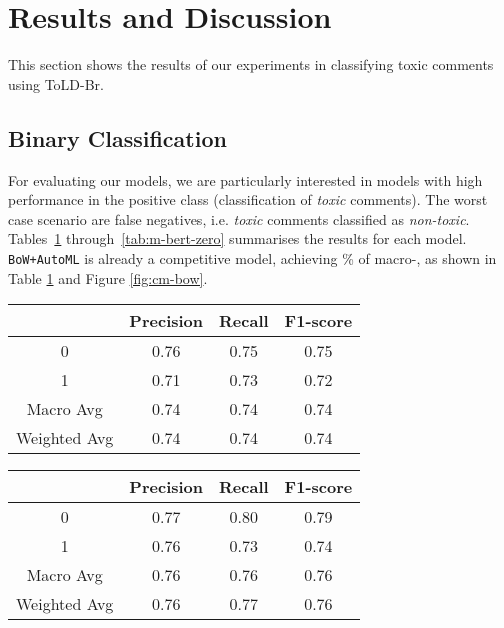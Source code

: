 \documentclass[11pt,a4paper]{article}
\begin{document}
\section{Results and Discussion} \label{sec:results}
This section shows the results of our experiments in classifying toxic comments using ToLD-Br.



\subsection{Binary Classification}

For evaluating our models, we are particularly interested in models with high performance in the positive class (classification of \textit{toxic} comments). The worst case scenario are false negatives, i.e. \textit{toxic} comments classified as \textit{non-toxic}. Tables~\ref{tab:bow+automl} through~\ref{tab:m-bert-zero} summarises the results for each model. \texttt{BoW+AutoML} is already a competitive model, achieving \% of macro-, as shown in Table \ref{tab:bow+automl} and Figure \ref{fig:cm-bow}.

\begin{table}[!ht]
\centering
        \begin{tabular}{@{}cccc@{}}\toprule
                     & Precision & Recall & F1-score \\ \midrule
        0            & 0.76      & 0.75   & 0.75     \\
        1            & 0.71      & 0.73   & 0.72     \\ \hline
        Macro Avg    & 0.74      & 0.74   & 0.74     \\
        Weighted Avg & 0.74      & 0.74   & 0.74     \\ \bottomrule
        \end{tabular}
        \label{tab:bow+automl}
\end{table}

\begin{table}[!ht]
\centering
        \begin{tabular}{@{}cccc@{}}\toprule
                     & Precision & Recall & F1-score \\ \midrule
        0            & 0.77      & 0.80   & 0.79     \\
        1            & 0.76      & 0.73   & 0.74     \\ \hline
        Macro Avg    & 0.76      & 0.76   & 0.76     \\
        Weighted Avg & 0.76      & 0.77   & 0.76     \\ \bottomrule
        \end{tabular}
        \label{tab:br-bert}
\end{table}
\end{document}
